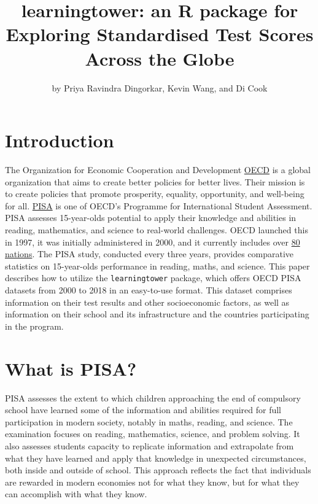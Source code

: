 \title{learningtower: an R package for Exploring Standardised Test
Scores Across the Globe}
\author{by Priya Ravindra Dingorkar, Kevin Wang, and Di Cook}

\maketitle


\hypertarget{introduction}{%
\section{Introduction}\label{introduction}}

The Organization for Economic Cooperation and Development
\href{OECD\%20-\%20https://www.oecd.org/about/}{OECD} is a global
organization that aims to create better policies for better lives. Their
mission is to create policies that promote prosperity, equality,
opportunity, and well-being for all.
\href{PISA\%20-\%20https://www.oecd.org/pisa/}{PISA} is one of OECD's
Programme for International Student Assessment. PISA assesses
15-year-olds potential to apply their knowledge and abilities in
reading, mathematics, and science to real-world challenges. OECD
launched this in 1997, it was initially administered in 2000, and it
currently includes over
\href{https://www.oecd.org/pisa/aboutpisa/pisa-participants.htm}{80
nations}. The PISA study, conducted every three years, provides
comparative statistics on 15-year-olds performance in reading, maths,
and science. This paper describes how to utilize the
\texttt{learningtower} package, which offers OECD PISA datasets from
2000 to 2018 in an easy-to-use format. This dataset comprises
information on their test results and other socioeconomic factors, as
well as information on their school and its infrastructure and the
countries participating in the program.

\hypertarget{what-is-pisa}{%
\section{What is PISA?}\label{what-is-pisa}}

PISA assesses the extent to which children approaching the end of
compulsory school have learned some of the information and abilities
required for full participation in modern society, notably in maths,
reading, and science. The examination focuses on reading, mathematics,
science, and problem solving. It also assesses students capacity to
replicate information and extrapolate from what they have learned and
apply that knowledge in unexpected circumstances, both inside and
outside of school. This approach reflects the fact that individuals are
rewarded in modern economies not for what they know, but for what they
can accomplish with what they know.

